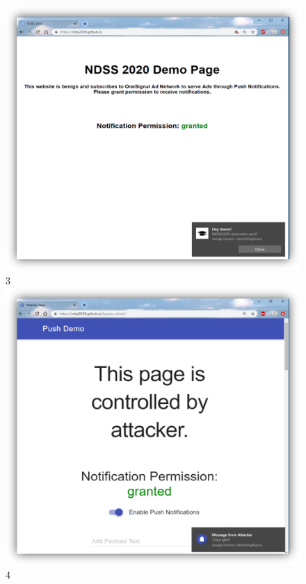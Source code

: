 \begin{figure}[ht]
\begin{center}
\begin{tabular}{cc}
\end{tabular}
      \includegraphics[width=\linewidth]{figs/attack_3.PNG}{3}
      \includegraphics[width=\linewidth]{figs/attack_4.PNG}{4}
\begin{tabular}{c c}
\hline
\end{tabular}
\label{tab1}
\end{center}
\end{figure}
 